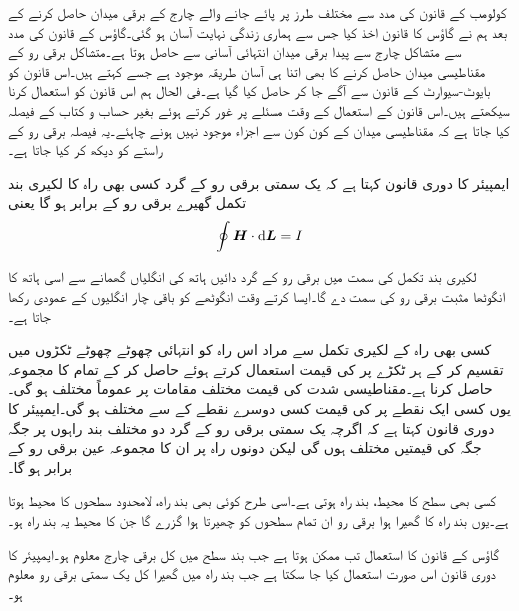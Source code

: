 کولومب کے قانون کی مدد سے مختلف طرز پر پائے جانے والے چارج کے برقی میدان حاصل کرنے کے بعد ہم نے گاؤس کا قانون اخذ کیا جس سے ہماری زندگی نہایت آسان ہو گئی۔گاؤس کے قانون کی مدد سے متشاکل چارج سے پیدا برقی میدان انتہائی آسانی سے حاصل ہوتا ہے۔متشاکل برقی رو کے مقناطیسی میدان حاصل کرنے کا بھی اتنا ہی آسان طریقہ موجود ہے جسے  کہتے ہیں۔اس قانون کو بایوٹ-سیوارٹ کے قانون سے آگے جا کر حاصل کیا گیا ہے۔فی الحال ہم اس قانون کو استعمال کرنا سیکھتے ہیں۔اس قانون کے استعمال کے وقت مسئلے پر غور کرتے ہوئے بغیر حساب و کتاب کے فیصلہ کیا جاتا ہے کہ مقناطیسی میدان کے کون کون سے اجزاء موجود نہیں ہونے چاہئے۔یہ فیصلہ برقی رو کے راستے کو دیکھ کر کیا جاتا ہے۔

ایمپیئر کا دوری قانون کہتا ہے کہ یک سمتی برقی رو کے گرد کسی بھی راہ  کا لکیری بند تکمل گھیرے برقی رو کے برابر ہو گا یعنی
\begin{align}\label{مساوات_مقناطیسی_ایمپیئر_کا_دوری_قانون}
\oint \kvec{H} \cdot \dif \kvec{L}=I
\end{align}

لکیری بند تکمل کی سمت میں برقی رو کے گرد  دائیں ہاتھ کی انگلیاں گھمانے سے اسی ہاتھ کا انگوٹھا مثبت برقی رو کی سمت دے گا۔ایسا کرتے وقت انگوٹھے کو باقی چار انگلیوں کے عمودی رکھا جاتا ہے۔

کسی بھی راہ  کے لکیری تکمل سے مراد اس راہ  کو انتہائی چھوٹے چھوٹے ٹکڑوں  میں تقسیم کر کے ہر ٹکڑے پر  کی قیمت استعمال کرتے ہوئے  حاصل کر کے تمام  کا مجموعہ حاصل کرنا ہے۔مقناطیسی شدت  کی قیمت مختلف مقامات پر عموماً مختلف ہو گی۔یوں کسی ایک نقطے پر  کی قیمت کسی دوسرے نقطے کے  سے مختلف ہو گی۔ایمپیئر کا دوری قانون کہتا ہے کہ اگرچہ یک سمتی برقی رو کے گرد دو مختلف بند راہوں پر جگہ جگہ  کی قیمتیں مختلف ہوں گی لیکن دونوں راہ پر ان کا مجموعہ عین برقی رو کے برابر ہو گا۔

کسی بھی سطح کا محیط، بند راہ ہوتی ہے۔اسی طرح کوئی بھی بند راہ، لامحدود سطحوں کا محیط ہوتا ہے۔یوں بند راہ کا گھیرا ہوا برقی رو ان تمام سطحوں کو چھیرتا ہوا گزرے گا جن کا محیط یہ بند راہ ہو۔

گاؤس کے قانون کا استعمال تب ممکن ہوتا ہے جب بند سطح میں کل برقی چارج معلوم ہو۔ایمپیئر کا دوری قانون اس صورت استعمال کیا جا سکتا ہے جب  بند راہ میں گھیرا کل یک سمتی برقی رو معلوم ہو۔   

